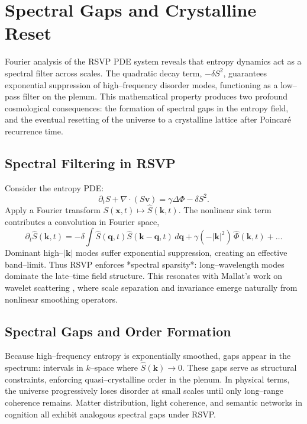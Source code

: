 \documentclass[a4paper,11pt,openany]{book}
\begin{document}
\chapter{Spectral Gaps and Crystalline Reset}

Fourier analysis of the RSVP PDE system reveals that entropy dynamics act as a spectral
filter across scales. The quadratic decay term, $-\delta S^2$, guarantees exponential 
suppression of high–frequency disorder modes, functioning as a low–pass filter on the
plenum. This mathematical property produces two profound cosmological consequences: the
formation of spectral gaps in the entropy field, and the eventual resetting of the 
universe to a crystalline lattice after Poincaré recurrence time.

\section{Spectral Filtering in RSVP}

Consider the entropy PDE:
\[
\partial_t S + \nabla\cdot(S\mathbf{v}) = \gamma \Delta \Phi - \delta S^2.
\]
Apply a Fourier transform $S(\mathbf{x},t) \mapsto \hat{S}(\mathbf{k},t)$. The nonlinear
sink term contributes a convolution in Fourier space,
\[
\partial_t \hat{S}(\mathbf{k},t) = - \delta \!\int \hat{S}(\mathbf{q},t)\hat{S}(\mathbf{k-q},t)\,d\mathbf{q} 
+ \gamma (-|\mathbf{k}|^2)\,\hat{\Phi}(\mathbf{k},t) + \dots
\]
Dominant high–$|\mathbf{k}|$ modes suffer exponential suppression, creating an effective 
band–limit. Thus RSVP enforces *spectral sparsity*: long–wavelength modes dominate the 
late–time field structure. This resonates with Mallat’s work on wavelet scattering 
\citep{mallat2008wavelet}, where scale separation and invariance emerge naturally from 
nonlinear smoothing operators.

\section{Spectral Gaps and Order Formation}

Because high–frequency entropy is exponentially smoothed, gaps appear in the spectrum:
intervals in $k$–space where $\hat{S}(\mathbf{k}) \to 0$. These gaps serve as structural
constraints, enforcing quasi–crystalline order in the plenum. In physical terms, the 
universe progressively loses disorder at small scales until only long–range coherence 
remains. Matter distribution, light coherence, and semantic networks in cognition all
exhibit analogous spectral gaps under RSVP.
\end{document}
